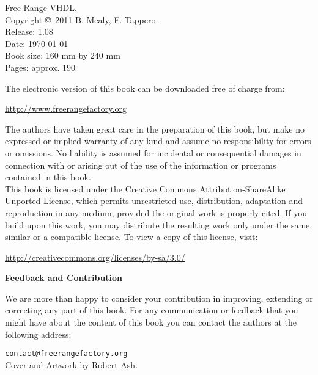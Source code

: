 %
%
%
\setcounter{page}{1}

{\footnotesize
\noindent
Free Range VHDL.\\
Copyright \copyright \ 2011 B. Mealy, F. Tappero.\\
Release: 1.08\\
Date: \today\\
Book size: 160 mm by 240 mm\\
Pages: approx. 190\\
\vspace{20pt}

\noindent
The electronic version of this book can be downloaded free of charge from:

\noindent
\url{http://www.freerangefactory.org}

\vspace{15pt}

\noindent
The authors have taken great care in the preparation of this book, but make no expressed or implied warranty of any kind and assume no responsibility for errors or omissions. No liability is assumed for incidental or consequential damages in connection with or arising out of the use of the information or programs contained in this book.\\

\noindent
This book is licensed under the Creative Commons Attribution-ShareAlike Unported License, which permits unrestricted use, distribution, adaptation and reproduction in any medium, provided the original work is properly cited. If you build upon this work, you may distribute the resulting work only under the same, similar or a compatible license. To view a copy of this license, visit:

\noindent
\url{http://creativecommons.org/licenses/by-sa/3.0/}
\vspace{25pt}

\noindent
{\sffamily\bfseries Feedback and Contribution}

\noindent
We are more than happy to consider your contribution in improving, extending or correcting any part of this book.
For any communication or feedback that you might have about the content of this book you can contact the authors at the following address:

\noindent
\texttt{contact@freerangefactory.org}\\

\vfill
\noindent
Cover and Artwork by Robert Ash.

} %
